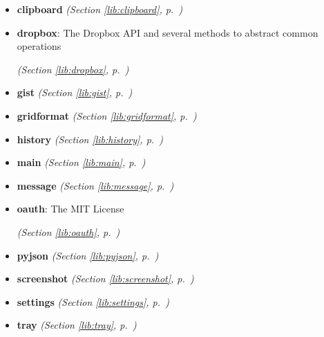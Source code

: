 \begin{itemize}
\setlength{\parskip}{0ex}
\item \textbf{clipboard}
  \textit{(Section \ref{lib:clipboard}, p.~\pageref{lib:clipboard})}

\item \textbf{dropbox}: The Dropbox API and several methods to abstract common operations



  \textit{(Section \ref{lib:dropbox}, p.~\pageref{lib:dropbox})}

\item \textbf{gist}
  \textit{(Section \ref{lib:gist}, p.~\pageref{lib:gist})}

\item \textbf{gridformat}
  \textit{(Section \ref{lib:gridformat}, p.~\pageref{lib:gridformat})}

\item \textbf{history}
  \textit{(Section \ref{lib:history}, p.~\pageref{lib:history})}

\item \textbf{main}
  \textit{(Section \ref{lib:main}, p.~\pageref{lib:main})}

\item \textbf{message}
  \textit{(Section \ref{lib:message}, p.~\pageref{lib:message})}

\item \textbf{oauth}: The MIT License



  \textit{(Section \ref{lib:oauth}, p.~\pageref{lib:oauth})}

\item \textbf{pyjson}
  \textit{(Section \ref{lib:pyjson}, p.~\pageref{lib:pyjson})}

\item \textbf{screenshot}
  \textit{(Section \ref{lib:screenshot}, p.~\pageref{lib:screenshot})}

\item \textbf{settings}
  \textit{(Section \ref{lib:settings}, p.~\pageref{lib:settings})}

\item \textbf{tray}
  \textit{(Section \ref{lib:tray}, p.~\pageref{lib:tray})}

\end{itemize}



